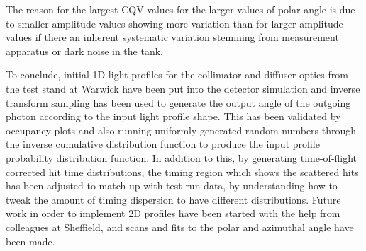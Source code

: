 The reason for the largest CQV values for the larger values of polar angle is due to smaller amplitude values showing more variation than for larger amplitude values if there an inherent systematic variation stemming from measurement apparatus or dark noise in the tank. 

To conclude, initial 1D light profiles for the collimator and diffuser optics from the test stand at Warwick have been put into the detector simulation and inverse transform sampling has been used to generate the output angle of the outgoing photon according to the input light profile shape. This has been validated by occupancy plots and also running uniformly generated random numbers through the inverse cumulative distribution function to produce the input profile probability distribution function. In addition to this, by generating time-of-flight corrected hit time distributions, the timing region which shows the scattered hits has been adjusted to match up with test run data, by understanding how to tweak the amount of timing dispersion to have different distributions. Future work in order to implement 2D profiles have been started with the help from colleagues at Sheffield, and scans and fits to the polar and azimuthal angle have been made. 

